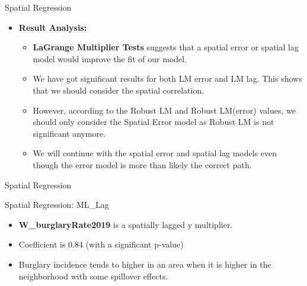 \documentclass[10pt, aspectratio=169]{beamer}
\begin{document}
\begin{frame}{Spatial Regression}
    
    \begin{itemize}
    
        \item \textbf{Result Analysis:} 
        
        \begin{itemize}
            \item \textbf{LaGrange Multiplier Tests} suggests that a spatial error or spatial lag model would improve the fit of our model.
            \item \textbf{} We have got significant results for both LM error and LM lag. This shows that we should consider the spatial correlation. 
            \item \textbf{} However, according to the Robust LM and Robust LM(error) values, we should only consider the Spatial Error model as Robust LM is not significant anymore.
            \item \textbf{} We will continue with the spatial error and spatial lag models even though the error model is more than likely the correct path. 
        \end{itemize}
    \end{itemize}
\end{frame}

\begin{frame}{Spatial Regression}
    \resizebox{\textwidth}{!}{}
\end{frame}


\begin{frame}{Spatial Regression: ML\_Lag}
    \small\begin{table}[!h]
        
        \caption{\label{tab:ml_lag_summary} Estimation results of ML\_Lag regression.}
    \end{table}
    \begin{itemize}
         
        \item \textbf{W\_burglaryRate2019} is a spatially lagged y multiplier. 
        \item \textbf{} Coefficient is 0.84 (with a significant p-value)
        \item \textbf{} Burglary incidence tends to higher in an area when it is higher in the neighborhood with some spillover effects.  
        
    \end{itemize}
\end{frame}
\end{document}
